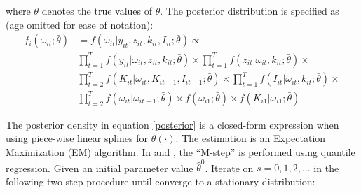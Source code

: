 \documentclass{article}
\begin{document}
where $\bar{\theta}$ denotes the true values of $\theta$. The posterior distribution is specified as (age omitted for ease of notation):
\begin{equation}\label{posterior}
\begin{split}
f_{i}(\omega_{it};\bar{\theta})&=f(\omega_{it}|y_{it}, z_{it}, k_{it}, I_{it}; \bar{\theta}) \propto\\
&\prod_{t=1}^{T}f(y_{it}|\omega_{it}, z_{it}, k_{it};\bar{\theta})\times
\prod_{t=1}^{T}f(z_{it}|\omega_{it}, k_{it};\bar{\theta})\times\\
&\prod_{t=2}^{T}f(K_{it}|\omega_{it}, K_{it-1}, I_{it-1};\bar{\theta})\times \prod_{t=1}^{T}f(I_{it}|\omega_{it}, k_{it}; \bar{\theta})\times \\
&\prod_{t=2}^{T}f(\omega_{it}|\omega_{it-1};\bar{\theta})\times f(\omega_{i1};\bar{\theta})\times f(K_{i1}|\omega_{i1};\bar{\theta})
\end{split}
\end{equation}

The posterior density in equation \eqref{posterior} is a closed-form expression when using piece-wise linear splines for $\theta(\cdot)$. The estimation is an Expectation Maximization (EM) algorithm. In \cite{Arellano2016} and \cite{Arellano2017}, the ``M-step'' is performed using quantile regression. Given an initial parameter value $\hat{\theta}^{0}$. Iterate on $s=0,1,2,\dots$ in the following two-step procedure until converge to a stationary distribution:
\end{document}
